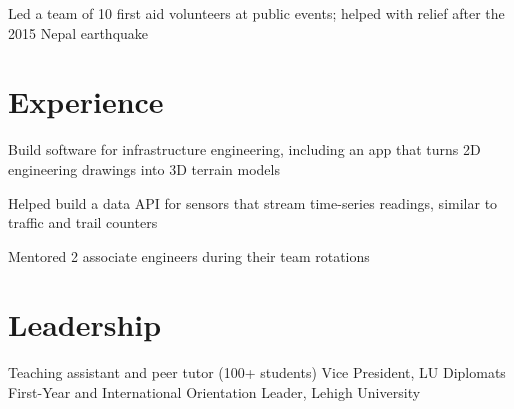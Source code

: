 \documentclass[]{deedy-resume-openfont}
\begin{document}
\begin{minipage}[t]{0.67\textwidth}
Led a team of 10 first aid volunteers at public events; helped with relief after the 2015 Nepal earthquake
\sectionsep

\section{Experience}
\begin{tightemize}
\item Build software for infrastructure engineering, including an app that turns 2D engineering drawings into 3D terrain models
\item Helped build a data API for sensors that stream time-series readings, similar to traffic and trail counters
\item Mentored 2 associate engineers during their team rotations
\end{tightemize}
\sectionsep

\section{Leadership}
Teaching assistant and peer tutor (100+ students) \textbullet{} Vice President, LU Diplomats \textbullet{} First-Year and International Orientation Leader, Lehigh University

\end{minipage}
\end{document}
